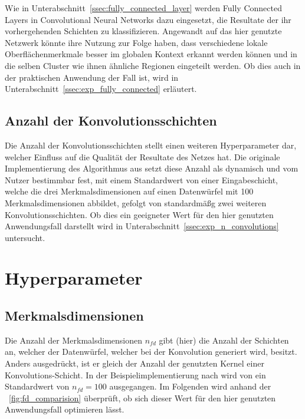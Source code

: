 Wie in Unterabschnitt~\ref{ssec:fully_connected_layer} werden Fully Connected Layers in Convolutional Neural Networks dazu eingesetzt, die Resultate der ihr vorhergehenden Schichten zu klassifizieren. Angewandt auf das hier genutzte Netzwerk könnte ihre Nutzung zur Folge haben, dass verschiedene lokale Oberflächenmerkmale besser im globalen Kontext erkannt werden können und \ggf in die selben Cluster wie ihnen ähnliche Regionen eingeteilt werden. Ob dies auch in der praktischen Anwendung der Fall ist, wird in Unterabschnitt~\ref{ssec:exp_fully_connected} erläutert.

\subsection{Anzahl der Konvolutionsschichten}

Die Anzahl der Konvolutionsschichten stellt einen weiteren Hyperparameter dar, welcher Einfluss auf die Qualität der Resultate des Netzes hat. Die originale Implementierung des Algorithmus aus \cite{kanezaki_18} setzt diese Anzahl als dynamisch und vom Nutzer bestimmbar fest, mit einem Standardwert von einer Eingabeschicht, welche die drei Merkmalsdimensionen auf einen Datenwürfel mit 100 Merkmalsdimensionen abbildet, gefolgt von standardmäßg zwei weiteren Konvolutionsschichten. Ob dies ein geeigneter Wert für den hier genutzten Anwendungsfall darstellt wird in Unterabschnitt~\ref{ssec:exp_n_convolutions} untersucht.

\iffalse

\section{Hyperparameter}
\label{sec:hyperparameter}


\subsection{Merkmalsdimensionen}

Die Anzahl der Merkmalsdimensionen $n_{fd}$ gibt (hier) die Anzahl der Schichten an, welcher der Datenwürfel, welcher bei der Konvolution generiert wird, besitzt. Anders ausgedrückt, ist er gleich der Anzahl der genutzten Kernel einer Konvolutions-Schicht. In der Beispielimplementierung nach \cite{kanezaki_18} wird von ein Standardwert von $n_{fd} = 100$ ausgegangen. Im Folgenden wird anhand der \figurename~\ref{fig:fd_comparision} überprüft, ob sich dieser Wert für den hier genutzten Anwendungsfall optimieren lässt.


